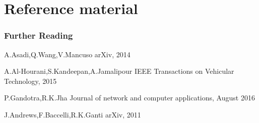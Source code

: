 \section {Reference material}

\begin{frame}[allowframebreaks]
  \frametitle<presentation>{Further Reading}    
  \begin{thebibliography}{10}    
    \beamertemplatebookbibitems
    A.Asadi,Q.Wang,V.Mancuso
    \newblock arXiv, 2014
    
    \beamertemplatebookbibitems
    A.Al-Hourani,S.Kandeepan,A.Jamalipour
    \newblock IEEE Transactions on Vehicular Technology, 2015

    \beamertemplatebookbibitems
    P.Gandotra,R.K.Jha
    \newblock Journal of network and computer applications, August 2016

    \beamertemplatebookbibitems
    J.Andrews,F.Baccelli,R.K.Ganti
    \newblock arXiv, 2011
  \end{thebibliography}
\end{frame}
